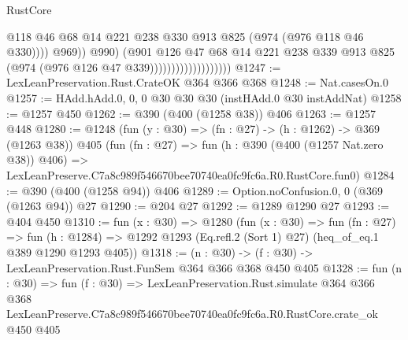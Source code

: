 \begin{lexlean}{RustCore}
\begin{coremodule}
                                              @118
                                              @46
                                              @68
                                              @14
                                              @221
                                              @238
                                              @330
                                              @913
                                              @825
                                              (@974 (@976 @118 @46 @330))))
                                          @969))
                                      @990)
                                    (@901
                                      @126
                                      @47
                                      @68
                                      @14
                                      @221
                                      @238
                                      @339
                                      @913
                                      @825
                                      (@974 (@976 @126 @47 @339)))))))))))))))))))
@1247 := LexLeanPreservation.Rust.CrateOK @364 @366 @368
@1248 := Nat.casesOn.{0}
@1257 := HAdd.hAdd.{0, 0, 0} @30 @30 @30 (instHAdd.{0} @30 instAddNat)
@1258 := @1257 @450
@1262 := @390 (@400 (@1258 @38)) @406
@1263 := @1257 @448
@1280 := @1248
    (fun (y : @30) => (fn : @27) -> (h : @1262) -> @369 (@1263 @38))
    @405
    (fun (fn : @27) =>
    fun (h : @390 (@400 (@1257 Nat.zero @38)) @406) =>
    LexLeanPreserve.C7a8c989f546670bee70740ea0fc9fc6a.R0.RustCore.fun0)
@1284 := @390 (@400 (@1258 @94)) @406
@1289 := Option.noConfusion.{0, 0} (@369 (@1263 @94)) @27
@1290 := @204 @27
@1292 := @1289 @1290 @27
@1293 := @404 @450
@1310 := fun (x : @30) =>
  @1280
    (fun (x : @30) =>
    fun (fn : @27) =>
    fun (h : @1284) => @1292 @1293 (Eq.refl.{2} (Sort 1) @27) (heq_of_eq.{1} @389 @1290 @1293 @405))
@1318 := (n : @30) -> (f : @30) -> LexLeanPreservation.Rust.FunSem @364 @366 @368 @450 @405
@1328 := fun (n : @30) =>
  fun (f : @30) =>
  LexLeanPreservation.Rust.simulate
    @364
    @366
    @368
    LexLeanPreserve.C7a8c989f546670bee70740ea0fc9fc6a.R0.RustCore.crate_ok
    @450
    @405
\end{coremodule}
\end{lexlean}

